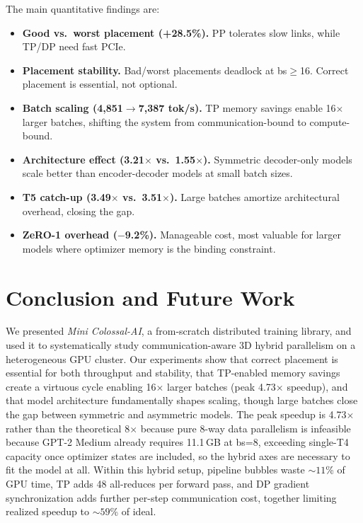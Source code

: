 \documentclass[conference]{IEEEtran}
\begin{document}
The main quantitative findings are:

\begin{itemize}
\item \textbf{Good vs.\ worst placement (+28.5\%).} PP tolerates slow links, while TP/DP need fast PCIe.
\item \textbf{Placement stability.} Bad/worst placements deadlock at bs${\geq}$16. Correct placement is essential, not optional.
\item \textbf{Batch scaling (4,851$\rightarrow$7,387 tok/s).} TP memory savings enable 16$\times$ larger batches, shifting the system from communication-bound to compute-bound.
\item \textbf{Architecture effect (3.21$\times$ vs.\ 1.55$\times$).} Symmetric decoder-only models scale better than encoder-decoder models at small batch sizes.
\item \textbf{T5 catch-up (3.49$\times$ vs.\ 3.51$\times$).} Large batches amortize architectural overhead, closing the gap.
\item \textbf{ZeRO-1 overhead ($-$9.2\%).} Manageable cost, most valuable for larger models where optimizer memory is the binding constraint.
\end{itemize}

\section{Conclusion and Future Work}

We presented \textit{Mini Colossal-AI}, a from-scratch distributed training library, and used it to systematically study communication-aware 3D hybrid parallelism on a heterogeneous GPU cluster. Our experiments show that correct placement is essential for both throughput and stability, that TP-enabled memory savings create a virtuous cycle enabling 16$\times$ larger batches (peak 4.73$\times$ speedup), and that model architecture fundamentally shapes scaling, though large batches close the gap between symmetric and asymmetric models. The peak speedup is 4.73$\times$ rather than the theoretical 8$\times$ because pure 8-way data parallelism is infeasible because GPT-2 Medium already requires 11.1\,GB at bs=8, exceeding single-T4 capacity once optimizer states are included, so the hybrid axes are necessary to fit the model at all. Within this hybrid setup, pipeline bubbles waste ${\sim}11$\% of GPU time, TP adds 48 all-reduces per forward pass, and DP gradient synchronization adds further per-step communication cost, together limiting realized speedup to ${\sim}59$\% of ideal.
\end{document}
